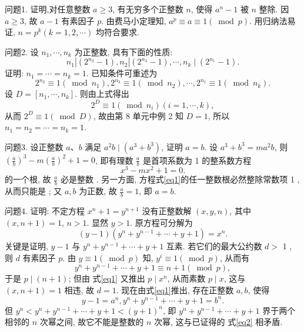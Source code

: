 
问题1. 证明,对任意整数 $a \geqslant 3$, 有无穷多个正整数 $n$, 使得 $a^n-1$ 被 $n$ 整除.
因 $a \geqslant 3$, 故 $a-1$ 有素因子 $p$. 由费马小定理知, $a^p \equiv a \equiv 1(\bmod p)$. 用归纳法易证, $n=p^k(k=1,2, \cdots)$ 均符合要求.



问题2. 设 $n_1, \cdots, n_k$ 为正整数, 具有下面的性质:
$$
n_1\left|\left(2^{n_2}-1\right), n_2\right|\left(2^{n_3}-1\right), \cdots, n_k \mid\left(2^{n_1}-1\right) .
$$
证明: $n_1=\cdots=n_k=1$.
已知条件可重述为
$$
2^{n_2} \equiv 1\left(\bmod n_1\right), 2^{n_3} \equiv 1\left(\bmod n_2\right), \cdots, 2^{n_1} \equiv 1\left(\bmod n_k\right) .
$$
设 $D=\left[n_1, \cdots, n_k\right]$. 则由上式得出
$$
2^D \equiv 1\left(\bmod n_i\right)(i=1, \cdots, k),
$$
从而 $2^D \equiv 1(\bmod D)$, 故由第 8 单元中例 2 知 $D=1$, 所以 $n_1=n_2=\cdots=n_k=1$.



问题3. 设正整数 $a 、 b$ 满足 $a^2 b \mid\left(a^3+b^3\right)$, 证明 $a=b$.
设 $a^3+b^3=m a^2 b$, 则 $\left(\frac{a}{b}\right)^3-m\left(\frac{a}{b}\right)^2+1=0$, 即有理数 $\frac{a}{b}$ 是首项系数为 1 的整系数方程
$$
x^3-m x^2+1=0 . \label{eq1}
$$
的一个根, 故 $\frac{a}{b}$ 必是整数 . 另一方面, 方程式\ref{eq1}的任一整数根必然整除常数项 1 , 从而只能是  ; 又 $a, b$ 为正数, 故 $\frac{a}{b}=1$, 即 $a=b$.



问题4. 证明: 不定方程 $x^n+1=y^{n+1}$ 没有正整数解 $(x, y, n)$, 其中 $(x, n+1)=1$, $n>1$.
显然 $y>1$. 原方程可分解为
$$
(y-1)\left(y^n+y^{n-1}+\cdots+y+1\right)=x^n . \label{eq1}
$$
关键是证明, $y-1$ 与 $y^n+y^{n-1}+\cdots+y+1$ 互素.
若它们的最大公约数 $d>$ 1 , 则 $d$ 有素因子 $p$. 由 $y \equiv 1(\bmod p)$ 知, $y^i \equiv 1(\bmod p)$, 从而有
$$
y^n+y^{n-1}+\cdots+y+1 \equiv n+1(\bmod p),
$$
于是 $p \mid(n+1)$; 但由 式\ref{eq1} 又推出 $p \mid x^n$, 从而素数 $p \mid x$, 这与 $(x, n+1)=1$ 相违, 故 $d=1$. 现在由式\ref{eq1}推出, 存在正整数 $a, b$, 使得
$$
y-1=a^n, y^n+y^{n-1}+\cdots+y+1=b^n . \label{eq2}
$$
但 $y^n<y^n+y^{n-1}+\cdots+y+1<(y+1)^n$, 即 $y^n+y^{n-1}+\cdots+y+1$ 界于两个相邻的 $n$ 次幂之间, 故它不能是整数的 $n$ 次幂, 这与已证得的 式\ref{eq2} 相矛盾.



